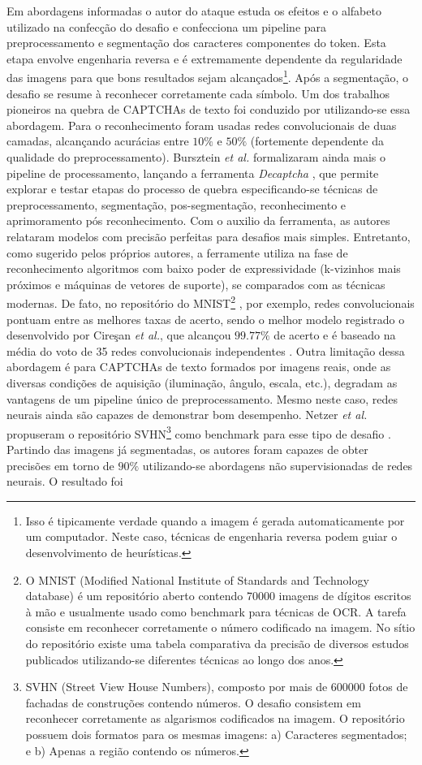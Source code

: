 Em abordagens informadas o autor do ataque estuda os efeitos e o alfabeto utilizado na confecção do desafio e confecciona um pipeline para preprocessamento e segmentação dos caracteres componentes do token. Esta etapa envolve engenharia reversa e é extremamente dependente da regularidade das imagens para que bons resultados sejam alcançados\footnote{Isso é tipicamente verdade quando a imagem é gerada automaticamente por um computador. Neste caso, técnicas de engenharia reversa podem guiar o desenvolvimento de heurísticas.}. Após a segmentação, o desafio se resume à reconhecer corretamente cada símbolo. Um dos trabalhos pioneiros na quebra de CAPTCHAs de texto foi conduzido por \cite{lectures2005HIP} utilizando-se essa abordagem. Para o reconhecimento foram usadas redes convolucionais de duas camadas, alcançando acurácias entre $10\%$ e $50\%$ (fortemente dependente da qualidade do preprocessamento). Bursztein \textit{et al.} formalizaram ainda mais o pipeline de processamento, lançando a ferramenta \textit{Decaptcha} \cite{bursztein2011text}, que permite explorar e testar etapas do processo de quebra especificando-se técnicas de preprocessamento, segmentação, pos-segmentação, reconhecimento e aprimoramento pós reconhecimento. Com o auxilio da ferramenta, as autores relataram modelos com precisão perfeitas para desafios mais simples. Entretanto, como sugerido pelos próprios autores, a ferramente utiliza na fase de reconhecimento algoritmos com baixo poder de expressividade (k-vizinhos mais próximos e máquinas de vetores de suporte), se comparados com as técnicas modernas. De fato, no repositório do MNIST\footnote{O MNIST (Modified National Institute of Standards and Technology database) é um repositório aberto contendo 70000 imagens de dígitos escritos à mão e usualmente usado como benchmark para técnicas de OCR. A tarefa consiste em reconhecer corretamente o número codificado na imagem. No sítio do repositório existe uma tabela comparativa da precisão de diversos estudos publicados utilizando-se diferentes técnicas ao longo dos anos.} \cite{yann1998mnist}, por exemplo, redes convolucionais pontuam entre as melhores taxas de acerto, sendo o melhor modelo registrado o desenvolvido por {Cire{\c s}an} \textit{et al.}, que alcançou $99.77\%$ de acerto e é baseado na média do voto de 35 redes convolucionais independentes \cite{ciresan2012column}. Outra limitação dessa abordagem é para CAPTCHAs de texto formados por imagens reais, onde as diversas condições de aquisição (iluminação, ângulo, escala, etc.), degradam as vantagens de um pipeline único de preprocessamento. Mesmo neste caso, redes neurais ainda são capazes de demonstrar bom desempenho. Netzer \textit{et al.} propuseram o repositório SVHN\footnote{SVHN (Street View House Numbers), composto por mais de 600000 fotos de fachadas de construções contendo números. O desafio consistem em reconhecer corretamente as algarismos codificados na imagem. O repositório possuem dois formatos para os mesmas imagens: a) Caracteres segmentados; e b) Apenas a região contendo os números.} como benchmark para esse tipo de desafio \cite{netzer2011reading}. Partindo das imagens já segmentadas, os autores foram capazes de obter precisões em torno de $90\%$ utilizando-se abordagens não supervisionadas de redes neurais. O resultado foi 